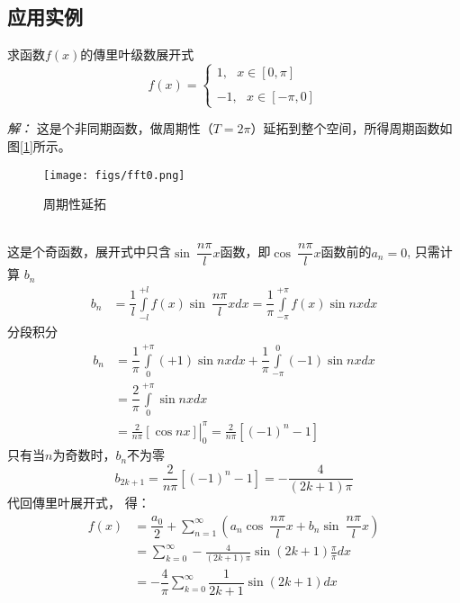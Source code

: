 \subsection{应用实例}
\begin{example} 
	求函数$f(x)$的傳里叶级数展开式
$$ f(x)=\begin{cases}
		1 , ~~~ x \in [0, \pi] \\
         \\
		-1 ,~~~ x \in [-\pi, 0] 
	\end{cases} $$
\end{example}
\emph{解：} 
	这是个非同期函数，做周期性（$T=2\pi$）延拓到整个空间，所得周期函数如图[\ref{fig:prolongation}]所示。
	\begin{figure}[h]
		\centering
		\texttt{[image: figs/fft0.png]}
		\caption{周期性延拓}
		\label{fig:prolongation}
	\end{figure}
    ~~\\ 
	这是个奇函数，展开式中只含$\sin~ \dfrac{n\pi}{l} x$函数，即$\cos~ \dfrac{n\pi}{l} x$函数前的$a_n=0$, 只需计算 $b_n$ 
	$$ \begin{aligned}
		b_n &= \dfrac{1}{l} \int\limits_{-l}^{+l} f(x) \sin~ \dfrac{n\pi}{l} x  d x = \dfrac{1}{\pi} \int\limits_{-\pi}^{+\pi} f(x) \sin n x d x  
	\end{aligned}  $$
	分段积分
	$$ \begin{aligned}
		b_n &= \dfrac{1}{\pi} \int\limits_{0}^{+\pi} (+1) \sin n x d x +\dfrac{1}{\pi} \int\limits_{-\pi}^{0} (-1) \sin n x d x \\ 
		&= \dfrac{2}{\pi}\int\limits_{0}^{+\pi} \sin n x d x   \\
		&= \left. \frac{2}{n\pi} [\cos nx ] \right\vert _0 ^\pi = \frac{2}{n\pi} [ (-1) ^n -1] 
	\end{aligned}  $$
	只有当$n$为奇数时，$b_n$不为零
	$$b_{2k+1} = \frac{2}{n\pi} [ (-1) ^n -1] =  -\frac{4}{(2k+1)\pi}$$
	代回傳里叶展开式， 得：
$$  \begin{aligned}
	f(x) &=\dfrac{a_0}{2} +\sum\limits_{n=1}^{\infty}  \left(  a_n \cos~ \dfrac{n\pi}{l} x +  b_n \sin~ \dfrac{n\pi}{l} x  \right) \\
	&= \sum_{k=0}^{\infty} -\frac{4}{(2k+1)\pi} \sin(2k+1) \frac{\pi}{\pi} dx \\
 &= -\dfrac{4}{\pi} \sum_{k=0}^{\infty}  \dfrac{1}{2k+1} \sin(2k+1) dx \\ 
\end{aligned}   
 $$ 


